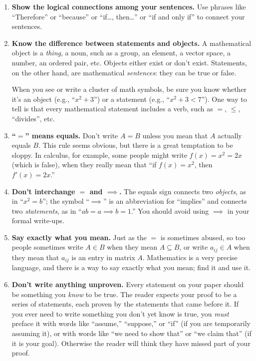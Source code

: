 \begin{enumerate}
\item \textbf{Show the logical connections among your sentences.}
        Use phrases like ``Therefore'' or ``because'' or ``if\ldots, then\ldots''
        or ``if and only if'' to connect your sentences.
  
\item \textbf{Know the difference between statements and objects.}
        A mathematical object is a \emph{thing}, a noun,
        such as a group, an element, a vector space, a number, an ordered pair, etc.
        Objects either exist or don't exist.
        Statements, on the other hand, are mathematical \emph{sentences}:  they can be true or false.
        
        When you see or write a cluster of math symbols, be sure you know 
        whether it's an object (e.g., ``$x^2+3$'') or a statement (e.g., ``$x^2+3<7$'').
        One way to tell is that every mathematical statement includes a verb, such as
        $=$, $\leq$, ``divides'', etc.
        
\item \textbf{``$=$'' means equals.}
        Don't write $A=B$ unless you mean that $A$ actually equals $B$.
        This rule seems obvious,
        but there is a great temptation to be sloppy.  In calculus, for example, some people might write $f(x)=x^{2}=2x$ (which is false), when they really mean that ``if $f(x)=x^{2}$, then $f'(x)=2x$.''

\item \textbf{Don't interchange ${=}$ and ${\implies}$.}
        The equals sign connects two \emph{objects}, as in ``$x^2=b$''; 
        the symbol ``$\implies$'' is an abbreviation for ``implies'' and connects two \emph{statements},
        as in ``$ab=a \implies b=1$.''  You should avoid using $\implies$ in your formal write-ups.

\item \textbf{Say exactly what you mean.}
        Just as the $=$ is sometimes abused,
        so too people sometimes write $A\in B$ when they mean $A\subseteq B$,
        or write $a_{ij}\in A$ when they mean that $a_{ij}$ is an entry in matrix $A$.
        Mathematics is a very precise language, and there is a way to say exactly what you mean;
        find it and use it.

\item \textbf{Don't write anything unproven.}
        Every statement on your paper should be something you \emph{know} to be true.
        The reader expects your proof to be a series of statements, each proven by the statements that came before it.
        If you ever need to write something you don't yet know is true,
        you \emph{must} preface it with words like ``assume,'' ``suppose,'' or ``if''
        (if you are temporarily assuming it),
        or with words like ``we need to show that'' or ``we claim that'' (if it is your goal).
        Otherwise the reader will think they have missed part of your proof.


\end{enumerate}
